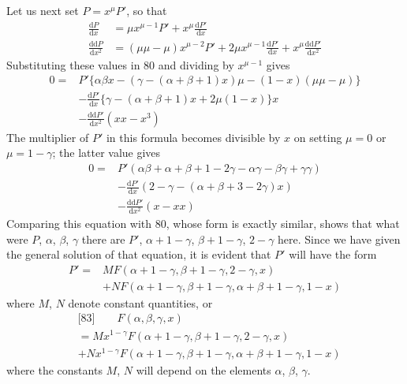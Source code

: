 
Let us next set $P=x^\mu P'$, so that
\[
\begin{aligned}
\frac{\mathrm{d}P}{\mathrm{d}x}&=\mu x^{\mu-1}P'+x^\mu\frac{\mathrm{d}P'}{\mathrm{d}x}\\
\frac{\mathrm{dd}P}{\mathrm{d}x^2}&=(\mu\mu-\mu)x^{\mu-2}P'+2\mu x^{\mu-1}\frac{\mathrm{d}P'}{\mathrm{d}x}+x^\mu\frac{\mathrm{dd}P'}{\mathrm{d}x^2}
\end{aligned}
\]
Substituting these values in 80 and dividing by $x^{\mu-1}$ gives
\[
\begin{aligned}
0={}&P'\{\alpha\beta x-(\gamma-(\alpha+\beta+1)x)\mu-(1-x)(\mu\mu-\mu)\}\\
&-\frac{\mathrm{d}P'}{\mathrm{d}x}\{\gamma-(\alpha+\beta+1)x+2\mu(1-x)\}x\\
&-\frac{\mathrm{dd}P'}{\mathrm{d}x^2}(xx-x^3)
\end{aligned}
\]
The multiplier of $P'$ in this formula becomes divisible by $x$ on setting $\mu=0$ or $\mu=1-\gamma$; the latter value gives
\[
\begin{aligned}
0={}&P'(\alpha\beta+\alpha+\beta+1-2\gamma-\alpha\gamma-\beta\gamma+\gamma\gamma)\\
&-\frac{\mathrm{d}P'}{\mathrm{d}x}(2-\gamma-(\alpha+\beta+3-2\gamma)x)\\
&-\frac{\mathrm{dd}P'}{\mathrm{d}x^2}(x-xx)
\end{aligned}
\]
Comparing this equation with 80, whose form is exactly similar, shows that what were $P$, $\alpha$, $\beta$, $\gamma$ there are $P'$, $\alpha+1-\gamma$, $\beta+1-\gamma$, $2-\gamma$ here. Since we have given the general solution of that equation, it is evident that $P'$ will have the form
\[
\begin{aligned}
P'={}&MF(\alpha+1-\gamma,\beta+1-\gamma,2-\gamma,x)\\
&+NF(\alpha+1-\gamma,\beta+1-\gamma,\alpha+\beta+1-\gamma,1-x)
\end{aligned}
\]
where $M$, $N$ denote constant quantities, or
\[
\begin{aligned}
&\text{[83]}\qquad F(\alpha,\beta,\gamma,x)\\&=Mx^{1-\gamma}F(\alpha+1-\gamma,\beta+1-\gamma,2-\gamma,x)\\
&+Nx^{1-\gamma}F(\alpha+1-\gamma,\beta+1-\gamma,\alpha+\beta+1-\gamma,1-x)
\end{aligned}
\]
where the constants $M$, $N$ will depend on the elements $\alpha$, $\beta$, $\gamma$.

